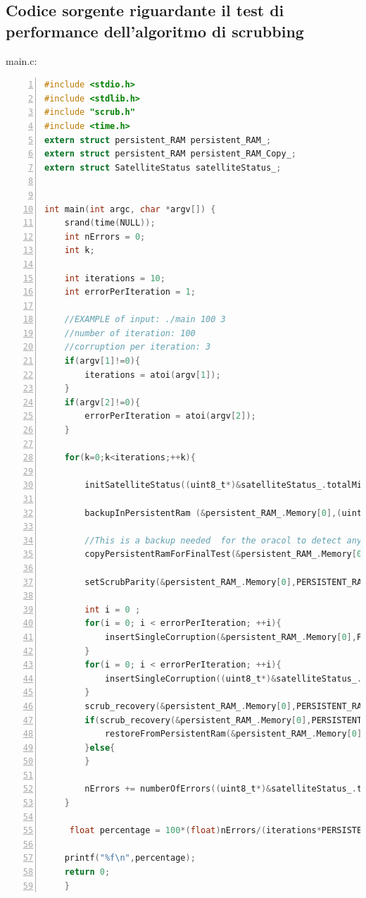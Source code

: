 \documentclass[LaM,binding=0.6cm,oneside]{../sapthesis}
\begin{document}
\subsection{Codice sorgente riguardante il test di performance dell'algoritmo di scrubbing}
main.c:
\begin{lstlisting}[language=C,
                   basicstyle=\scriptsize,
                   numbers=left,
                   stepnumber=0,
                   numbersep=4pt,
                   tabsize=2,
                   showspaces=false,
                   showstringspaces=false]
#include <stdio.h>
#include <stdlib.h>
#include "scrub.h"
#include <time.h>
extern struct persistent_RAM persistent_RAM_;
extern struct persistent_RAM persistent_RAM_Copy_;
extern struct SatelliteStatus satelliteStatus_;


int main(int argc, char *argv[]) {
    srand(time(NULL));
    int nErrors = 0;
    int k;

    int iterations = 10;
    int errorPerIteration = 1;
    
    //EXAMPLE of input: ./main 100 3
    //number of iteration: 100
    //corruption per iteration: 3
    if(argv[1]!=0){
    	iterations = atoi(argv[1]);
    }
    if(argv[2]!=0){
    	errorPerIteration = atoi(argv[2]);
    }
    
    for(k=0;k<iterations;++k){
    
        initSatelliteStatus((uint8_t*)&satelliteStatus_.totalMissionMinutes, PERSISTENT_RAM_LENGTH);
        
        backupInPersistentRam (&persistent_RAM_.Memory[0],(uint8_t*)&satelliteStatus_.totalMissionMinutes,PERSISTENT_RAM_LENGTH);
        
        //This is a backup needed  for the oracol to detect any persistent corruption in satelliteStatus
        copyPersistentRamForFinalTest(&persistent_RAM_.Memory[0],&persistent_RAM_Copy_.Memory[0],PERSISTENT_RAM_LENGTH);
        
        setScrubParity(&persistent_RAM_.Memory[0],PERSISTENT_RAM_LENGTH/8);

        int i = 0 ;
        for(i = 0; i < errorPerIteration; ++i){
            insertSingleCorruption(&persistent_RAM_.Memory[0],PERSISTENT_RAM_LENGTH,0);
        }
        for(i = 0; i < errorPerIteration; ++i){
            insertSingleCorruption((uint8_t*)&satelliteStatus_.totalMissionMinutes,PERSISTENT_RAM_LENGTH,0);
        }
        scrub_recovery(&persistent_RAM_.Memory[0],PERSISTENT_RAM_LENGTH/8);
        if(scrub_recovery(&persistent_RAM_.Memory[0],PERSISTENT_RAM_LENGTH/8)==0){
            restoreFromPersistentRam(&persistent_RAM_.Memory[0],(uint8_t*)&satelliteStatus_.totalMissionMinutes,PERSISTENT_RAM_LENGTH);
        }else{
        }

        nErrors += numberOfErrors((uint8_t*)&satelliteStatus_.totalMissionMinutes);
    }

     float percentage = 100*(float)nErrors/(iterations*PERSISTENT_RAM_LENGTH);

	printf("%f\n",percentage);
	return 0;
	}
\end{lstlisting}
\end{document}
